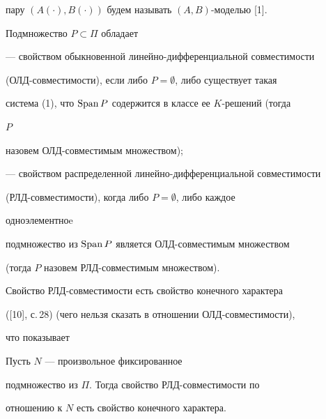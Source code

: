 пару $(A(\cdot),B(\cdot))$ будем называть $(A,B)$-моделью [1]. 


 


\begin{defn} 


Подмножество $P\subset\Pi$ обладает


 


--- свойством обыкновенной линейно-дифференциальной совместимости 


(ОЛД-сов\-мес\-ти\-мо\-сти), если либо $P=\emptyset$, либо существует такая 


система (1), что $\operatorname{Span} P$ содержится в классе ее $K$-решений (тогда 


$P$ 


назовем ОЛД-совместимым множеством); 


 


--- свойством распределенной линейно-дифференциальной совместимости 


(РЛД-сов\-мес\-ти\-мо\-сти), когда либо $P=\emptyset$, либо каждое 


одноэлементноe 


подмножество из $\operatorname{Span} P$ является ОЛД-совместимым множеством 


(тогда $P$ назовем РЛД-совместимым множеством). 


\end{defn} 


 


Свойство РЛД-совместимости есть свойство конечного характера 


([10], с.\,28) (чего нельзя сказать в отношении ОЛД-совместимости), 


что показывает 


 


\begin{assrt} 


Пусть $N$ --- произвольное фиксированное 


подмножество из $\Pi$. Тогда свойство РЛД-совместимости по 


отношению к $N$ есть свойство конечного характера. 


\end{assrt} 


 


